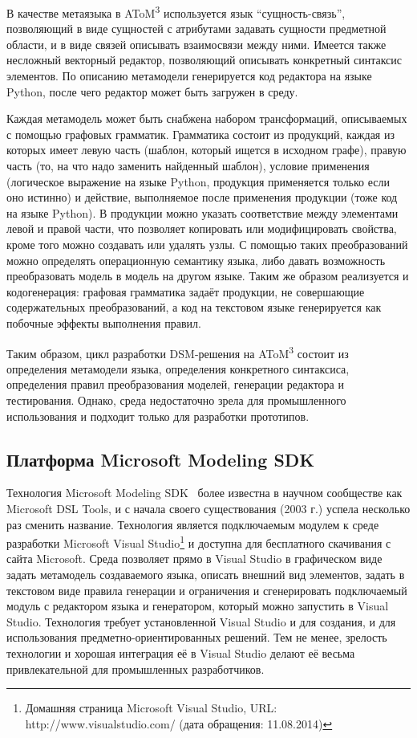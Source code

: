 В качестве метаязыка в AToM\textsuperscript{3} используется язык "`сущность-связь"', позволяющий в виде 
сущностей с атрибутами задавать сущности предметной области, и в виде связей описывать 
взаимосвязи между ними. Имеется также несложный векторный редактор, позволяющий описывать 
конкретный синтаксис элементов. По описанию метамодели генерируется код редактора 
на языке Python, после чего редактор может быть загружен в среду. 

Каждая метамодель может быть снабжена набором трансформаций, описываемых с помощью 
графовых грамматик. Грамматика состоит из продукций, каждая из которых имеет левую 
часть (шаблон, который ищется в исходном графе), правую часть (то, на что надо заменить 
найденный шаблон), условие применения (логическое выражение на языке Python, продукция 
применяется только если оно истинно) и действие, выполняемое после применения продукции 
(тоже код на языке Python). В продукции можно указать соответствие между элементами 
левой и правой части, что позволяет копировать или модифицировать свойства, кроме 
того можно создавать или удалять узлы. С помощью таких преобразований можно определять 
операционную семантику языка, либо давать возможность преобразовать модель в модель 
на другом языке. Таким же образом реализуется и кодогенерация: графовая грамматика 
задаёт продукции, не совершающие содержательных преобразований, а код на текстовом 
языке генерируется как побочные эффекты выполнения правил.

Таким образом, цикл разработки DSM-решения на AToM\textsuperscript{3} состоит из определения метамодели 
языка, определения конкретного синтаксиса, определения правил преобразования моделей, 
генерации редактора и тестирования. Однако, среда недостаточно зрела для промышленного 
использования и подходит только для разработки прототипов.

\subsection{Платформа Microsoft Modeling SDK}
Технология Microsoft Modeling SDK~\cite{cook2007domain} более известна в научном сообществе как Microsoft DSL Tools,
и с начала своего существования (2003 г.) успела несколько раз сменить название. Технология является
подключаемым модулем к среде разработки Microsoft Visual Studio\footnote
{Домашняя страница Microsoft Visual Studio, URL: http://www.visualstudio.com/ (дата обращения: 11.08.2014)}
и доступна для бесплатного скачивания с сайта Microsoft. Среда позволяет прямо в Visual Studio
в графическом виде задать метамодель создаваемого языка, описать внешний вид элементов, 
задать в текстовом виде правила генерации и ограничения и сгенерировать подключаемый модуль с
редактором языка и генератором, который можно запустить в Visual Studio. Технология требует установленной 
Visual Studio и для создания, и для использования предметно-ориентированных решений.
Тем не менее, зрелость технологии и хорошая интеграция её в Visual Studio делают её
весьма привлекательной для промышленных разработчиков.

